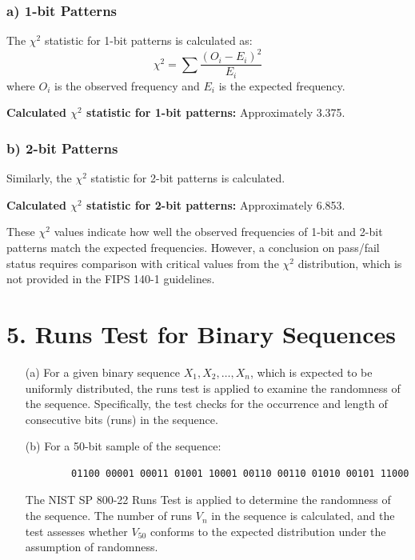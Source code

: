 \documentclass[12pt,openany]{book}
\theoremstyle{definition}
\begin{document}
\subsubsection*{a) 1-bit Patterns}
The $\chi^2$ statistic for 1-bit patterns is calculated as:
\[ \chi^2 = \sum \frac{(O_i - E_i)^2}{E_i} \]
where $O_i$ is the observed frequency and $E_i$ is the expected frequency.

\textbf{Calculated $\chi^2$ statistic for 1-bit patterns:} Approximately 3.375.

\subsubsection*{b) 2-bit Patterns}
Similarly, the $\chi^2$ statistic for 2-bit patterns is calculated. 

\textbf{Calculated $\chi^2$ statistic for 2-bit patterns:} Approximately 6.853.

These $\chi^2$ values indicate how well the observed frequencies of 1-bit and 2-bit patterns match the expected frequencies. However, a conclusion on pass/fail status requires comparison with critical values from the $\chi^2$ distribution, which is not provided in the FIPS 140-1 guidelines.


\section*{5. Runs Test for Binary Sequences}

\begin{itemize}
	\item[(a)] For a given binary sequence \( X_1, X_2, \ldots, X_n \), which is expected to be uniformly distributed, the runs test is applied to examine the randomness of the sequence. Specifically, the test checks for the occurrence and length of consecutive bits (runs) in the sequence.
	
	\item[(b)] For a 50-bit sample of the sequence:
	\begin{verbatim}
		01100 00001 00011 01001 10001 00110 00110 01010 00101 11000
	\end{verbatim}
	The NIST SP 800-22 Runs Test is applied to determine the randomness of the sequence. The number of runs \( V_n \) in the sequence is calculated, and the test assesses whether \( V_{50} \) conforms to the expected distribution under the assumption of randomness.
\end{itemize}

\newpage
\end{document}
